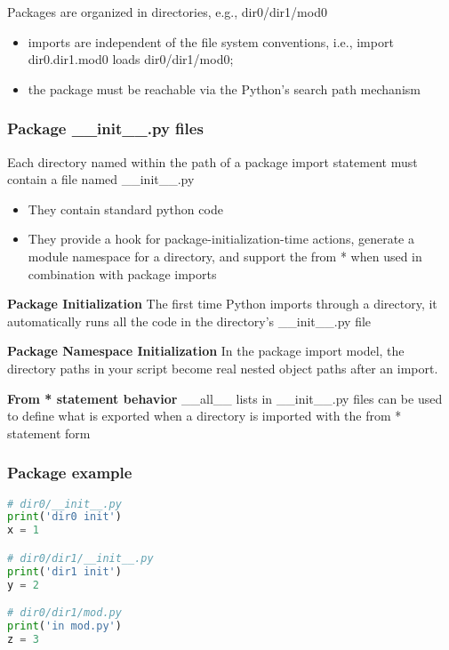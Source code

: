 Packages are organized in directories, e.g., dir0/dir1/mod0

\begin{itemize}
  \item imports are independent of the file system conventions, i.e., import dir0.dir1.mod0 loads dir0/dir1/mod0;
  \item the package must be reachable via the Python’s search path mechanism
\end{itemize}

\subsubsection{Package \_\_init\_\_.py files}

Each directory named within the path of a package import statement must contain a file named \_\_init\_\_.py

\begin{itemize}
  \item They contain standard python code
  \item They provide a hook for package-initialization-time actions, generate a module namespace for a directory, and support the from * when used in combination with package imports
\end{itemize}

\textbf{Package Initialization}
The first time Python imports through a directory, it automatically runs all the code in the directory’s \_\_init\_\_.py file

\textbf{Package Namespace Initialization}
In the package import model, the directory paths in your script become real nested object paths after an import.

\textbf{From * statement behavior}
\_\_all\_\_ lists in \_\_init\_\_.py files can be used to define what is exported when a directory is imported with the from * statement form

\subsubsection{Package example}

\begin{lstlisting}[language=Python]
# dir0/__init__.py
print('dir0 init')
x = 1

# dir0/dir1/__init__.py
print('dir1 init')
y = 2

# dir0/dir1/mod.py
print('in mod.py')
z = 3
\end{lstlisting}


